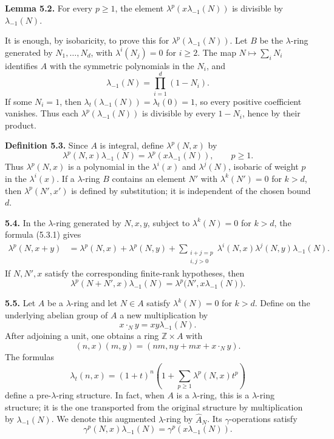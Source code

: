 \documentclass[11pt]{article}
\begin{document}
\textbf{Lemma 5.2.} For every \(p\ge1\), the element \(\lambda^p(x\lambda_{-1}(N))\) is divisible by \(\lambda_{-1}(N)\).

It is enough, by isobaricity, to prove this for \(\lambda^p(\lambda_{-1}(N))\). Let \(B\) be the \(\lambda\)-ring generated by \(N_1,\ldots,N_d\), with \(\lambda^i(N_j)=0\) for \(i\ge2\). The map \(N\mapsto\sum_iN_i\) identifies \(A\) with the symmetric polynomials in the \(N_i\), and
\[
  \lambda_{-1}(N)=\prod_{i=1}^{d}(1-N_i).
\]
If some \(N_i=1\), then \(\lambda_t(\lambda_{-1}(N))=\lambda_t(0)=1\), so every positive coefficient vanishes. Thus each \(\lambda^p(\lambda_{-1}(N))\) is divisible by every \(1-N_i\), hence by their product.

\textbf{Definition 5.3.} Since \(A\) is integral, define \(\lambda^p(N,x)\) by
\begin{equation}\tag{5.3.1}
  \lambda^p(N,x)\lambda_{-1}(N)=\lambda^p(x\lambda_{-1}(N)),
  \qquad p\ge1.
\end{equation}
Thus \(\lambda^p(N,x)\) is a polynomial in the \(\lambda^i(x)\) and \(\lambda^j(N)\), isobaric of weight \(p\) in the \(\lambda^i(x)\). If a \(\lambda\)-ring \(B\) contains an element \(N'\) with \(\lambda^k(N')=0\) for \(k>d\), then \(\lambda^p(N',x')\) is defined by substitution; it is independent of the chosen bound \(d\).

\textbf{5.4.} In the \(\lambda\)-ring generated by \(N,x,y\), subject to \(\lambda^k(N)=0\) for \(k>d\), the formula (5.3.1) gives
\begin{align}
 \lambda^p(N,x+y)
 &=\lambda^p(N,x)+\lambda^p(N,y) 
   +\sum_{\substack{i+j=p\\ i,j>0}}
     \lambda^i(N,x)\lambda^j(N,y)\lambda_{-1}(N).
 \tag{5.4.1}
\end{align}
If \(N,N',x\) satisfy the corresponding finite-rank hypotheses, then
\begin{equation}\tag{5.4.2}
  \lambda^p(N+N',x)\lambda_{-1}(N)
  =\lambda^p\bigl(N',x\lambda_{-1}(N)\bigr).
\end{equation}

\textbf{5.5.} Let \(A\) be a \(\lambda\)-ring and let \(N\in A\) satisfy \(\lambda^k(N)=0\) for \(k>d\). Define on the underlying abelian group of \(A\) a new multiplication by
\[
  x\cdot_N y=xy\lambda_{-1}(N).
\]
After adjoining a unit, one obtains a ring \(\mathbb Z\times A\) with
\[
  (n,x)(m,y)=(nm,ny+mx+x\cdot_N y).
\]
The formulas
\begin{equation}\tag{5.5.1}
  \lambda_t(n,x)=(1+t)^n\left(1+
  \sum_{p\ge1}\lambda^p(N,x)t^p\right)
\end{equation}
define a pre-\(\lambda\)-ring structure. In fact, when \(A\) is a \(\lambda\)-ring, this is a \(\lambda\)-ring structure; it is the one transported from the original structure by multiplication by \(\lambda_{-1}(N)\). We denote this augmented \(\lambda\)-ring by \(\widehat A_N\). Its \(\gamma\)-operations satisfy
\begin{equation}\tag{5.5.2}
  \gamma^p(N,x)\lambda_{-1}(N)=\gamma^p(x\lambda_{-1}(N)).
\end{equation}
\end{document}

